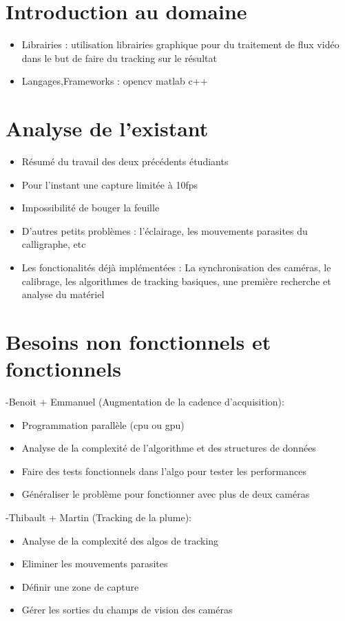 \documentclass{article}
\begin{document}
\section{Introduction au domaine}
\begin{itemize}
\item Librairies : utilisation librairies graphique pour du traitement de flux vidéo dans le but de faire du tracking sur le résultat
\item Langages,Frameworks : opencv matlab c++
\end{itemize}
\section{Analyse de l'existant}
\begin{itemize}
\item Résumé du travail des deux précédents étudiants
\item Pour l'instant une capture limitée à 10fps
\item Impossibilité de bouger la feuille
\item D'autres petits problèmes : l'éclairage, les mouvements parasites du calligraphe, etc
\item Les fonctionalités déjà implémentées : La synchronisation des caméras, le calibrage, les algorithmes de tracking basiques, une première recherche et analyse du matériel
\end{itemize}
\section{Besoins non fonctionnels et fonctionnels}
-Benoit + Emmanuel (Augmentation de la cadence d'acquisition):
\begin{itemize}
\item Programmation parallèle (cpu ou gpu)
\item Analyse de la complexité de l'algorithme et des structures de données
\item Faire des tests fonctionnels dans l'algo pour tester les performances
\item Généraliser le problème pour fonctionner avec plus de deux caméras
\end{itemize}

-Thibault + Martin (Tracking de la plume):
\begin{itemize}
\item Analyse de la complexité des algos de tracking
\item Eliminer les mouvements parasites
\item Définir une zone de capture
\item Gérer les sorties du champs de vision des caméras
\end{itemize}
\end{document}

